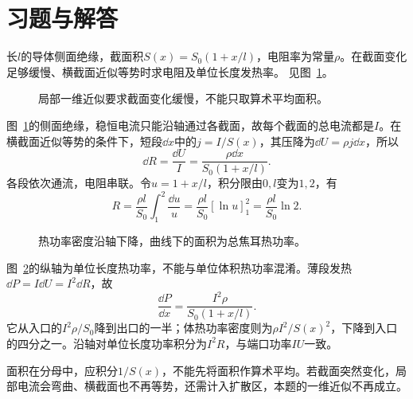 




\section{习题与解答}

\begin{exercise}[变截面导体的电阻]\label{ex:c1-h1}
长$l$的导体侧面绝缘，截面积$S(x)=S_0(1+x/l)$，电阻率为常量$\rho$。在截面变化足够缓慢、横截面近似等势时求电阻及单位长度发热率。 见图~\ref{fig:c1-h1-q}。
\end{exercise}

\begin{figure}[H]\centering
{}
\caption{局部一维近似要求截面变化缓慢，不能只取算术平均面积。}\label{fig:c1-h1-q}
\end{figure}
\begin{solution}
图~\ref{fig:c1-h1-q}的侧面绝缘，稳恒电流只能沿轴通过各截面，故每个截面的总电流都是$I$。在横截面近似等势的条件下，短段$\dd x$中的$j=I/S(x)$，其压降为$\dd U=\rho j\dd x$，所以
\[
 \dd R=\frac{\dd U}I=\frac{\rho\dd x}{S_0(1+x/l)}.
\]
各段依次通流，电阻串联。令$u=1+x/l$，积分限由$0,l$变为$1,2$，有
\[
 \boxed{R=\frac{\rho l}{S_0}\int_1^2\frac{\dd u}u
 =\frac{\rho l}{S_0}[\ln u]_1^2
 =\frac{\rho l}{S_0}\ln2}.
\]
\begin{figure}[H]\centering
{}
\caption{热功率密度沿轴下降，曲线下的面积为总焦耳热功率。}\label{fig:c1-h1-s}
\end{figure}
图~\ref{fig:c1-h1-s}的纵轴为单位长度热功率，不能与单位体积热功率混淆。薄段发热$\dd P=I\dd U=I^2\dd R$，故
\[
 \boxed{\frac{\dd P}{\dd x}=\frac{I^2\rho}{S_0(1+x/l)}}.
\]
它从入口的$I^2\rho/S_0$降到出口的一半；体热功率密度则为$\rho I^2/S(x)^2$，下降到入口的四分之一。沿轴对单位长度功率积分为$I^2R$，与端口功率$IU$一致。

面积在分母中，应积分$1/S(x)$，不能先将面积作算术平均。若截面突然变化，局部电流会弯曲、横截面也不再等势，还需计入扩散区，本题的一维近似不再成立。
\end{solution}

